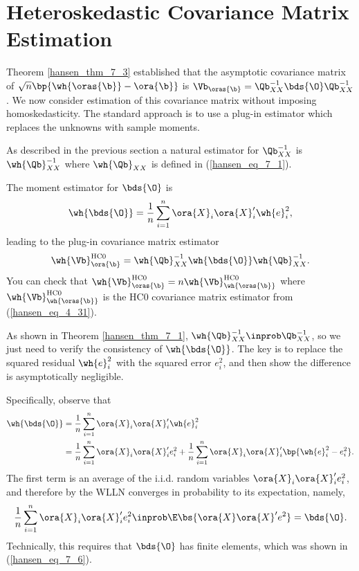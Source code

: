 \section{Heteroskedastic Covariance Matrix Estimation} \label{hansen_sec_7_7}

Theorem \ref{hansen_thm_7_3} established that the asymptotic covariance matrix of $\sqrt{n} \bp{\wh{\oras{\b}} - \ora{\b}}$ is $\Vb_{\oras{\b}} = \Qb_{XX}^{-1} \bds{\O} \Qb_{XX}^{-1}$. We now consider estimation of this covariance matrix without imposing homoskedasticity. The standard approach is to use a plug-in estimator which replaces the unknowns with sample moments.

As described in the previous section a natural estimator for $\Qb_{XX}^{-1}$ is $\wh{\Qb}_{XX}^{-1}$ where $\wh{\Qb}_{XX}$ is defined in (\ref{hansen_eq_7_1}).

The moment estimator for $\bds{\O}$ is 
\begin{equation}
    \notag
    \wh{\bds{\O}} = \frac{1}{n} \sum_{i=1}^{n} \ora{X}_i \ora{X}_i^\prime \wh{e}_i^2,
\end{equation}
leading to the plug-in covariance matrix estimator 
\begin{equation}
    \label{hansen_eq_7_19}
    \wh{\Vb}_{\ora{\b}}^{\text{HC0}} = \wh{\Qb}_{XX}^{-1} \wh{\bds{\O}} \wh{\Qb}_{XX}^{-1}.
\end{equation}
You can check that $\wh{\Vb}_{\oras{\b}}^{\text{HC0}} = n \wh{\Vb}_{\wh{\oras{\b}}}^{\text{HC0}}$ where $\wh{\Vb}_{\wh{\oras{\b}}}^{\text{HC0}}$ is the HC0 covariance matrix estimator from (\ref{hansen_eq_4_31}).

As shown in Theorem \ref{hansen_thm_7_1}, $\wh{\Qb}_{XX}^{-1} \inprob \Qb_{XX}^{-1}$, so we just need to verify the consistency of $\wh{\bds{\O}}$. The key is to replace the squared residual $\wh{e}_i^2$ with the squared error $e_i^2$, and then show the difference is asymptotically negligible.

Specifically, observe that 
\begin{equation}
	\notag
	\begin{aligned}
		\wh{\bds{\O}} & = \frac{1}{n} \sum_{i=1}^{n} \ora{X}_i \ora{X}_i^\prime \wh{e}_i^2 \\
        & = \frac{1}{n} \sum_{i=1}^{n} \ora{X}_i \ora{X}_i^\prime {e}_i^2 + \frac{1}{n} \sum_{i=1}^{n} \ora{X}_i \ora{X}_i^\prime \bp{\wh{e}_i^2 - e_i^2}.
	\end{aligned}
\end{equation}
The first term is an average of the i.i.d. random variables $\ora{X}_i \ora{X}_i^\prime {e}_i^2$, and therefore by the WLLN converges in probability to its expectation, namely, 
\begin{equation}
    \notag
    \frac{1}{n} \sum_{i=1}^{n} \ora{X}_i \ora{X}_i^\prime {e}_i^2 \inprob \E\bs{\ora{X} \ora{X}^\prime {e}^2} = \bds{\O}.
\end{equation}
Technically, this requires that $\bds{\O}$ has finite elements, which was shown in (\ref{hansen_eq_7_6}).

